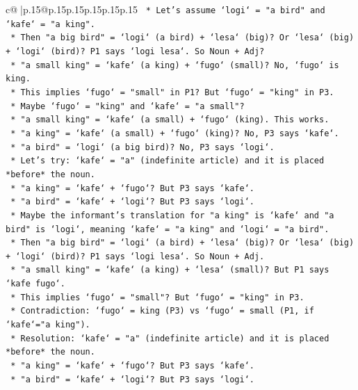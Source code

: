 \documentclass{article}
\begin{document}
{\begin{supertabular}{c@{$\;$}|p{.15\linewidth}@{}p{.15\linewidth}p{.15\linewidth}p{.15\linewidth}p{.15\linewidth}p{.15\linewidth}}
{{{\texttt{            *   Let's assume `logi` = "a bird" and `kafe` = "a king".} \\
\texttt{            *   Then "a big bird" = `logi` (a bird) + `lesa` (big)? Or `lesa` (big) + `logi` (bird)? P1 says `logi lesa`. So Noun + Adj?} \\
\texttt{            *   "a small king" = `kafe` (a king) + `fugo` (small)? No, `fugo` is king.} \\
\texttt{            *   This implies `fugo` = "small" in P1? But `fugo` = "king" in P3.} \\
\texttt{            *   Maybe `fugo` = "king" and `kafe` = "a small"?} \\
\texttt{                *   "a small king" = `kafe` (a small) + `fugo` (king). This works.} \\
\texttt{                *   "a king" = `kafe` (a small) + `fugo` (king)? No, P3 says `kafe`.} \\
\texttt{                *   "a bird" = `logi` (a big bird)? No, P3 says `logi`.} \\
\texttt{            *   Let's try: `kafe` = "a" (indefinite article) and it is placed *before* the noun.} \\
\texttt{                *   "a king" = `kafe` + `fugo`? But P3 says `kafe`.} \\
\texttt{                *   "a bird" = `kafe` + `logi`? But P3 says `logi`.} \\
\texttt{            *   Maybe the informant's translation for "a king" is `kafe` and "a bird" is `logi`, meaning `kafe` = "a king" and `logi` = "a bird".} \\
\texttt{            *   Then "a big bird" = `logi` (a bird) + `lesa` (big)? Or `lesa` (big) + `logi` (bird)? P1 says `logi lesa`. So Noun + Adj.} \\
\texttt{            *   "a small king" = `kafe` (a king) + `lesa` (small)? But P1 says `kafe fugo`.} \\
\texttt{            *   This implies `fugo` = "small"? But `fugo` = "king" in P3.} \\
\texttt{            *   Contradiction: `fugo` = king (P3) vs `fugo` = small (P1, if `kafe`="a king").} \\
\texttt{            *   Resolution: `kafe` = "a" (indefinite article) and it is placed *before* the noun.} \\
\texttt{                *   "a king" = `kafe` + `fugo`? But P3 says `kafe`.} \\
\texttt{                *   "a bird" = `kafe` + `logi`? But P3 says `logi`.} \\
}}}
\end{supertabular}}
\end{document}
